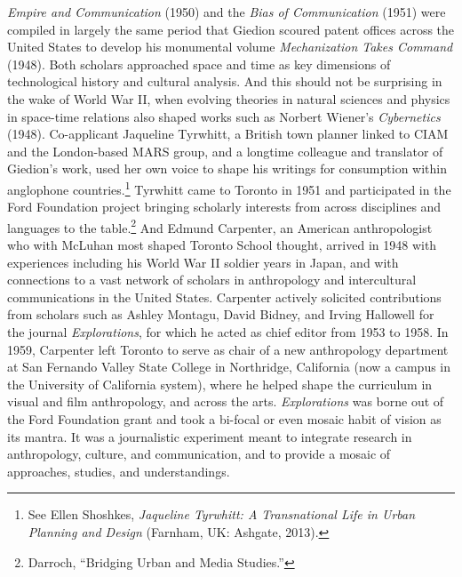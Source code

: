 \documentclass{tufte-handout}
\begin{document}
\emph{Empire and Communication} (1950) and the \emph{Bias of
Communication} (1951) were compiled in largely the same period that
Giedion scoured patent offices across the United States to develop his
monumental volume \emph{Mechanization Takes Command} (1948). Both
scholars approached space and time as key dimensions of technological
history and cultural analysis. And this should not be surprising in the
wake of World War II, when evolving theories in natural sciences and
physics in space-time relations also shaped works such as Norbert
Wiener's \emph{Cybernetics} (1948). Co-applicant Jaqueline Tyrwhitt, a
British town planner linked to CIAM and the London-based MARS group, and
a longtime colleague and translator of Giedion's work, used her own
voice to shape his writings for consumption within anglophone
countries.\footnote{See Ellen Shoshkes, \emph{Jaqueline Tyrwhitt: A
  Transnational Life in Urban Planning and Design} (Farnham, UK:
  Ashgate, 2013).} Tyrwhitt came to Toronto in 1951 and participated in
the Ford Foundation project bringing scholarly interests from across
disciplines and languages to the table.\footnote{Darroch, ``Bridging
  Urban and Media Studies.''} And Edmund Carpenter, an American
anthropologist who with McLuhan most shaped Toronto School thought,
arrived in 1948 with experiences including his World War II soldier
years in Japan, and with connections to a vast network of scholars in
anthropology and intercultural communications in the United States.
Carpenter actively solicited contributions from scholars such as Ashley
Montagu, David Bidney, and Irving Hallowell for the journal
\emph{Explorations}, for which he acted as chief editor from 1953 to
1958. In 1959, Carpenter left Toronto to serve as chair of a new
anthropology department at San Fernando Valley State College in
Northridge, California (now a campus in the University of California
system), where he helped shape the curriculum in visual and film
anthropology, and across the arts. \emph{Explorations} was borne out of
the Ford Foundation grant and took a bi-focal or even mosaic habit of
vision as its mantra. It was a journalistic experiment meant to
integrate research in anthropology, culture, and communication, and to
provide a mosaic of approaches, studies, and understandings.
\end{document}
